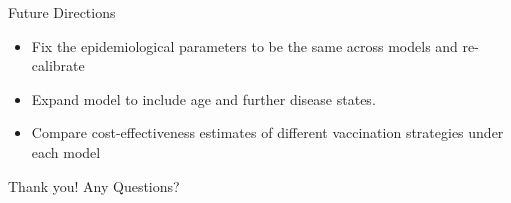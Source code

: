 \documentclass[aspectratio=169]{beamer}
\begin{document}
\begin{frame}{Future Directions}
	\begin{itemize}
      	     \item Fix the epidemiological parameters to be the same across models and re-calibrate \pause
            \item Expand model to include age and further disease states. \pause
            \item Compare cost-effectiveness estimates of different vaccination strategies under each model
	\end{itemize}
\end{frame}


\begin{frame}{Thank you!}
\centering
\huge
Any Questions?
\end{frame}
\end{document}
